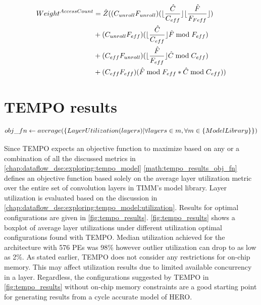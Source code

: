 \begin{equation}
    \begin{aligned}
        Weight^{AccessCount} & = \hat{Z}((C_{unroll}F_{unroll})(\lfloor\frac{\hat{C}}{C_{eff}} \rfloor \lfloor\frac{\hat{F}}{F_{Feff}}\rfloor) \\
            & +(C_{unroll}F_{eff})(\lfloor\frac{\hat{C}}{C_{eff}} \rfloor \hat{F}\bmod F_{eff}) \\
            & +(C_{eff}F_{unroll})(\lfloor\frac{\hat{F}}{F_{eff}} \rfloor \hat{C}\bmod C_{eff}) \\
            & + (C_{eff}F_{eff})(\hat{F}\bmod F_{eff}\space* \hat{C}\bmod C_{eff}))
        \end{aligned}
    \label{math:memory_access_weights}
\end{equation}

\section{TEMPO results}
\label{chap:dataflow_dse:exploring:results}

\begin{equation}
    obj\_fn \gets average (\{LayerUtilization(layers)\space|\space \forall layers \in m, \forall m \in \{ModelLibrary\}\})
\label{math:tempo_results_obj_fn}
\end{equation}

Since TEMPO expects an objective function to maximize based on any or a
combination of all the discussed metrics in
\autoref{chap:dataflow_dse:exploring:tempo_model}
\autoref{math:tempo_results_obj_fn} defines an objective function based solely
on the average layer utilization metric over the entire set of convolution
layers in TIMM's model library. Layer utilization is evaluated based on the
discussion in \autoref{chap:dataflow_dse:exploring:tempo_model:utilization}.
Results for optimal configurations are given in \autoref{fig:tempo_results}.
\autoref{fig:tempo_results} shows a boxplot of average layer utilizations under
different utilization optimal configurations found with TEMPO. Median
utilization achieved for the architecture with 576 PEs was 98\% however outlier
utilization can drop to as low as 2\%. As stated earlier, TEMPO does not
consider any restrictions for on-chip memory. This may affect utilization
results due to limited available concurrency in a layer. Regardless, the
configurations suggested by TEMPO in \autoref{fig:tempo_results} without on-chip
memory constraints are a good starting point for generating results from a cycle
accurate model of HERO.


